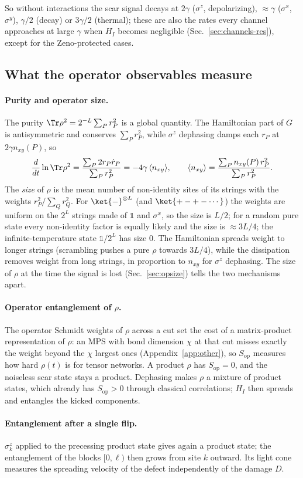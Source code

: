 So without interactions the scar signal decays at $2\gamma$ ($\sigma^z$, depolarizing), $\approx\gamma$ ($\sigma^x$, $\sigma^y$), $\gamma/2$ (decay) or $3\gamma/2$ (thermal); these are also the rates every channel approaches at large $\gamma$ when $H_I$ becomes negligible (Sec.~\ref{sec:channels-res}), except for the Zeno-protected cases.

\subsection{What the operator observables measure}
\label{sec:theory-observables}

\paragraph{Purity and operator size.} The purity $\Tr\rho^2 = 2^{-L}\sum_Pr_P^2$ is a global quantity. The Hamiltonian part of $G$ is antisymmetric and conserves $\sum_Pr_P^2$, while $\sigma^z$ dephasing damps each $r_P$ at $2\gamma n_{xy}(P)$, so
\begin{equation}
\frac{d}{dt}\ln\Tr\rho^2 = \frac{\sum_P 2r_P\dot r_P}{\sum_P r_P^2} = -4\gamma\,\langle n_{xy}\rangle, \qquad \langle n_{xy}\rangle = \frac{\sum_P n_{xy}(P)\,r_P^2}{\sum_Pr_P^2}.
\end{equation}
The \emph{size} of $\rho$ is the mean number of non-identity sites of its strings with the weights $r_P^2/\sum_Q r_Q^2$. For $\ket{-}^{\otimes L}$ (and $\ket{+-+-\cdots}$) the weights are uniform on the $2^L$ strings made of $\mathds 1$ and $\sigma^x$, so the size is $L/2$; for a random pure state every non-identity factor is equally likely and the size is $\approx 3L/4$; the infinite-temperature state $\mathds 1/2^L$ has size $0$. The Hamiltonian spreads weight to longer strings (scrambling pushes a pure $\rho$ towards $3L/4$), while the dissipation removes weight from long strings, in proportion to $n_{xy}$ for $\sigma^z$ dephasing. The size of $\rho$ at the time the signal is lost (Sec.~\ref{sec:opsize}) tells the two mechanisms apart.

\paragraph{Operator entanglement of $\rho$.} The operator Schmidt weights of $\rho$ across a cut set the cost of a matrix-product representation of $\rho$: an MPS with bond dimension $\chi$ at that cut misses exactly the weight beyond the $\chi$ largest ones (Appendix~\ref{app:other}), so $S_{\mathrm{op}}$ measures how hard $\rho(t)$ is for tensor networks. A product $\rho$ has $S_{\mathrm{op}} = 0$, and the noiseless scar state stays a product. Dephasing makes $\rho$ a mixture of product states, which already has $S_{\mathrm{op}} > 0$ through classical correlations; $H_I$ then spreads and entangles the kicked components.

\paragraph{Entanglement after a single flip.} $\sigma^z_k$ applied to the precessing product state gives again a product state; the entanglement of the blocks $[0, \ell)$ then grows from site $k$ outward. Its light cone measures the spreading velocity of the defect independently of the damage $D$.
